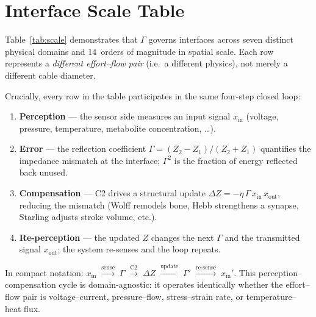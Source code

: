 \documentclass[aps,pre,twocolumn,superscriptaddress,floatfix]{revtex4-2}
\begin{document}
\section{Interface Scale Table}
\label{sec:scale}

Table~\ref{tab:scale} demonstrates that $\Gamma$ governs
interfaces across seven distinct physical domains and
14~orders of magnitude in spatial scale.
Each row represents a \emph{different effort--flow pair}
(i.e.\ a different physics), not merely a different cable
diameter.

Crucially, every row in the table participates in the
same four-step closed loop:
%
\begin{enumerate}
\item \textbf{Perception} --- the sensor side measures an
  input signal $x_{\text{in}}$ (voltage, pressure,
  temperature, metabolite concentration, \dots).
\item \textbf{Error} --- the reflection coefficient
  $\Gamma = (Z_2 - Z_1)/(Z_2 + Z_1)$ quantifies the
  impedance mismatch at the interface; $\Gamma^{2}$
  is the fraction of energy reflected back unused.
\item \textbf{Compensation} --- C2 drives a structural
  update $\Delta Z = -\eta\,\Gamma\,x_{\text{in}}\,
  x_{\text{out}}$, reducing the mismatch (Wolff remodels
  bone, Hebb strengthens a synapse, Starling adjusts
  stroke volume, etc.).
\item \textbf{Re-perception} --- the updated $Z$ changes
  the next $\Gamma$ and the transmitted signal
  $x_{\text{out}}$; the system re-senses and the loop
  repeats.
\end{enumerate}
%
\noindent
In compact notation:
$x_{\text{in}} \;\xrightarrow{\text{sense}}\;
 \Gamma \;\xrightarrow{\text{C2}}\;
 \Delta Z \;\xrightarrow{\text{update}}\;
 \Gamma' \;\xrightarrow{\text{re-sense}}\;
 x_{\text{in}}'$.
This perception--compensation cycle is domain-agnostic:
it operates identically whether the effort--flow pair is
voltage--current, pressure--flow, stress--strain rate, or
temperature--heat flux.
\end{document}
